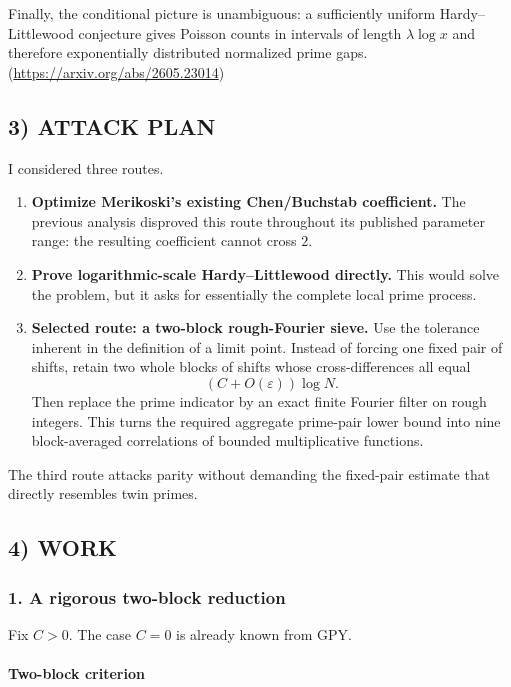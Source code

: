 Finally, the conditional picture is unambiguous: a sufficiently uniform Hardy–Littlewood conjecture gives Poisson counts in intervals of length \(\lambda\log x\) and therefore exponentially distributed normalized prime gaps. (\url{https://arxiv.org/abs/2605.23014})

\subsection*{3) ATTACK PLAN}

I considered three routes.

\begin{enumerate}
\item \textbf{Optimize Merikoski’s existing Chen/Buchstab coefficient.}
The previous analysis disproved this route throughout its published parameter range: the resulting coefficient cannot cross \(2\).

\item \textbf{Prove logarithmic-scale Hardy–Littlewood directly.}
This would solve the problem, but it asks for essentially the complete local prime process.

\item \textbf{Selected route: a two-block rough-Fourier sieve.}
Use the tolerance inherent in the definition of a limit point. Instead of forcing one fixed pair of shifts, retain two whole blocks of shifts whose cross-differences all equal
\[
(C+O(\varepsilon))\log N.
\]
Then replace the prime indicator by an exact finite Fourier filter on rough integers. This turns the required aggregate prime-pair lower bound into nine block-averaged correlations of bounded multiplicative functions.
\end{enumerate}

The third route attacks parity without demanding the fixed-pair estimate that directly resembles twin primes.

\subsection*{4) WORK}

\subsubsection*{1. A rigorous two-block reduction}

Fix \(C>0\). The case \(C=0\) is already known from GPY.

\paragraph{Two-block criterion}

